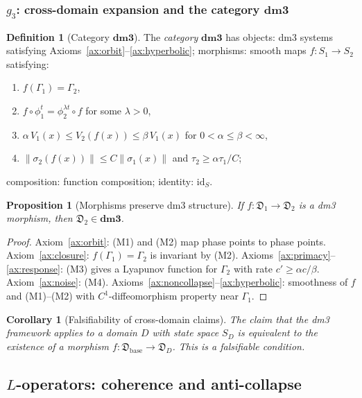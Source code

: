 \documentclass[12pt, oneside]{book}
\theoremstyle{plain}
\newtheorem{corollary}[theorem]{Corollary}
\newtheorem{proposition}[theorem]{Proposition}
\theoremstyle{definition}
\newtheorem{definition}{Definition}[section]
\theoremstyle{remark}
\newcommand{\dm}{\mathfrak{D}}
\newcommand{\dmcat}{\mathbf{dm3}}
\newcommand{\Orb}{\Gamma}
\newcommand{\norm}[1]{\left\|#1\right\|}
\begin{document}
\subsubsection{\texorpdfstring{$g_3$}{g3}: cross-domain expansion and the category \texorpdfstring{$\dmcat$}{dm3}}

\begin{definition}[Category $\dmcat$]\label{def:cat}
The \emph{category} $\dmcat$ has objects: dm3 systems satisfying
Axioms~\ref{ax:orbit}--\ref{ax:hyperbolic}; morphisms: smooth maps
$f\colon S_1\to S_2$ satisfying:
\begin{enumerate}[label=\textup{(M\arabic*)},leftmargin=2em]
  \item $f(\Orb_1)=\Orb_2$,
  \item $f\circ\phi_1^t=\phi_2^{\lambda t}\circ f$ for some $\lambda>0$,
  \item $\alpha\,V_1(x)\le V_2(f(x))\le\beta\,V_1(x)$ for
        $0<\alpha\le\beta<\infty$,
  \item $\norm{\sigma_2(f(x))}\le C\norm{\sigma_1(x)}$ and
        $\tau_2\ge\alpha\tau_1/C$;
\end{enumerate}
composition: function composition; identity: $\mathrm{id}_S$.
\end{definition}

\begin{proposition}[Morphisms preserve dm3 structure]\label{prop:morphism}
If $f\colon\dm_1\to\dm_2$ is a dm3 morphism, then $\dm_2\in\dmcat$.
\end{proposition}
\begin{proof}
Axiom~\ref{ax:orbit}: (M1) and (M2) map phase points to phase points.
Axiom~\ref{ax:closure}: $f(\Orb_1)=\Orb_2$ is invariant by (M2).
Axioms~\ref{ax:primacy}--\ref{ax:response}: (M3) gives a Lyapunov
function for $\Orb_2$ with rate $c'\ge\alpha c/\beta$.
Axiom~\ref{ax:noise}: (M4). Axioms~\ref{ax:noncollapse}--\ref{ax:hyperbolic}:
smoothness of $f$ and (M1)--(M2) with $C^1$-diffeomorphism property
near $\Orb_1$.
\end{proof}

\begin{corollary}[Falsifiability of cross-domain claims]\label{cor:false}
The claim that the dm3 framework applies to a domain $D$ with state
space $S_D$ is equivalent to the existence of a morphism
$f\colon\dm_{\mathrm{base}}\to\dm_D$. This is a falsifiable condition.
\end{corollary}

\subsection{\texorpdfstring{$L$}{L}-operators: coherence and anti-collapse}
\label{subsec:L}
\end{document}
